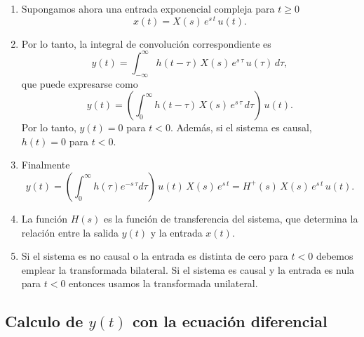 \documentclass[11pt,a4paper,openany]{book}
\begin{document}
\begin{enumerate}
	\item Supongamos ahora una entrada exponencial compleja para $t \geq 0$
	\begin{equation}
		x\left( t\right) = X(s) \, e^{s \, t} \, u(t).
	\end{equation}
	
	\item Por lo tanto, la integral de convoluci\'{o}n correspondiente es 
	\begin{equation}
		y\left( t\right) =
		\int_{-\infty}^{\infty }h\left( t - \tau \right) \, X(s) \, e^{s \, \tau} \, u(\tau) \, d\tau ,
	\end{equation}
	que puede expresarse como 
	\begin{equation}
		y\left( t\right) =
		\left( \int_{0}^{\infty }h\left(t - \tau\right) \, X(s) \,  e^{s \, \tau} \, d\tau \right) \, u(t).
	\end{equation}
	Por lo tanto, $y(t) = 0$ para $t < 0$. Además, si el sistema es causal, $h(t) = 0$ para $t < 0$.
	
	\item Finalmente
	\begin{equation}
		y(t) =
		\left(\int_{0}^{\infty }h\left(\tau\right) e^{- s \, \tau} d\tau\right) \, u(t) \, X(s) \, e^{s \, t}= 
		H^{+}(s) \, X(s) \, e^{s \, t} \, u(t).
		\label{laplaceunilateral}
	\end{equation}
	
	\item La función $H(s)$ es la función de transferencia del sistema, que determina la relación entre la salida $y(t)$ y la entrada $x(t)$.
	
	\item Si el sistema es no causal o la entrada es distinta de cero para $t < 0$ debemos emplear la transformada bilateral. Si el sistema es causal y la entrada es nula para $t < 0$ entonces usamos la transformada unilateral.
\end{enumerate}

\subsection{Calculo de $y(t)$ con la ecuación diferencial}
\end{document}
